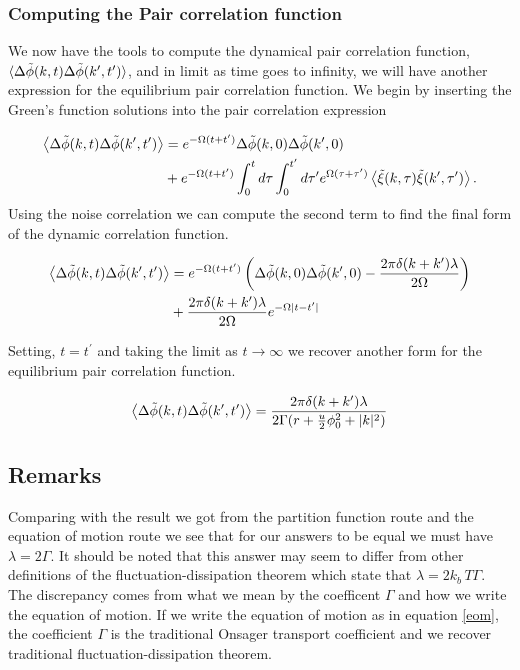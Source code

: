 \subsubsection{Computing the Pair correlation function}

We now have the tools to compute the dynamical pair correlation function, $\langle \Delta\tilde{\phi}(k, t)\Delta\tilde{\phi}(k^\prime, t^\prime) \rangle $, and in limit as time goes to infinity, we will have another expression for the equilibrium pair correlation function. We begin by inserting the Green's function solutions into the pair correlation expression

\begin{align}
\left\langle \Delta\tilde{\phi}(k, t) \Delta\tilde{\phi}(k^\prime, t^\prime)\right\rangle &=  e^{-\Omega(t+t^\prime)}\Delta\tilde{\phi}(k, 0)\Delta\tilde{\phi}(k^\prime, 0) \nonumber \\
 &+ e^{-\Omega (t+t^\prime)} \int_0^t d\tau \int_0^{t^\prime} d\tau^\prime e^{\Omega(\tau+\tau^\prime)}\left\langle \tilde{\xi}(k, \tau) \tilde{\xi}(k^\prime, \tau^\prime) \right\rangle.
\end{align}
Using the noise correlation we can compute the second term to find the final form of the dynamic correlation function.

\begin{align}
	\left\langle \Delta\tilde{\phi}(k, t) \Delta\tilde{\phi}(k^\prime, t^\prime)\right\rangle &=  e^{-\Omega(t+t^\prime)}\left(\Delta\tilde{\phi}(k, 0)\Delta\tilde{\phi}(k^\prime, 0) - \frac{2\pi\delta(k+k^\prime)\lambda}{2\Omega}\right) \nonumber \\
	&+ \frac{2\pi\delta(k+k^\prime)\lambda}{2\Omega}e^{-\Omega \vert t-t^\prime \vert}
\end{align}

Setting, $t = t^\prime$ and taking the limit as $t\rightarrow\infty$ we recover another form for the equilibrium pair correlation function.

\begin{equation}
	\left\langle \Delta\tilde{\phi}(k, t) \Delta\tilde{\phi}(k^\prime, t^\prime)\right\rangle = \frac{2\pi\delta(k+k^\prime)\lambda}{2\Gamma(r + \frac{u}{2}\phi_0^2 + \vert k\vert^2)}
\end{equation}

\subsection{Remarks}

Comparing with the result we got from the partition function route and the equation of motion route we see that for our answers to be equal we must have $\lambda = 2\Gamma$. It should be noted that this answer may seem to differ from other definitions of the fluctuation-dissipation theorem which state that $\lambda = 2k_b\,T\Gamma$. The discrepancy comes from what we mean by the coefficent $\Gamma$ and how we write the equation of motion. If we write the equation of motion as in equation \ref{eom}, the coefficient $\Gamma$ is the traditional Onsager transport coefficient and we recover traditional fluctuation-dissipation theorem.

